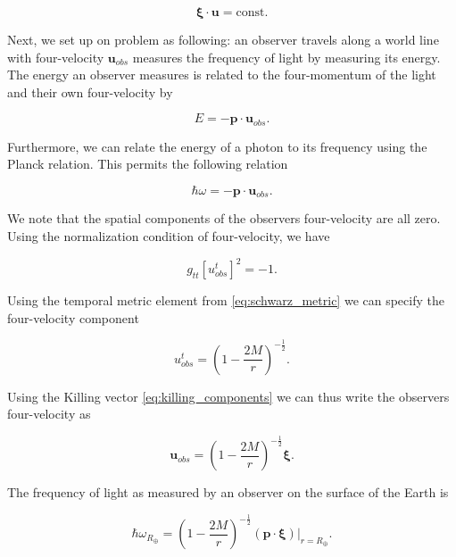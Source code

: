\documentclass[11pt]{article}
\begin{document}
\begin{equation}
    \label{eq:kiling_conserved}
    \boldsymbol{\xi} \cdot \boldsymbol{u} = \text{const}.
\end{equation}

Next, we set up on problem as following: an observer travels along a world line with four-velocity $\boldsymbol{u}_{obs}$ measures the frequency of light by measuring its energy. The energy an observer measures is related to the four-momentum of the light and their own four-velocity by

\begin{equation}
    E = - \boldsymbol{p} \cdot \boldsymbol{u}_{obs}.
\end{equation}

Furthermore, we can relate the energy of a photon to its frequency using the Planck relation. This permits the following relation

\begin{equation}
    \hbar \omega = - \boldsymbol{p} \cdot \boldsymbol{u}_{obs}.
\end{equation}

We note that the spatial components of the observers four-velocity are all zero. Using the normalization condition of four-velocity, we have

\begin{equation}
    g_{tt} [u_{obs}^t]^2 = -1.
\end{equation}

Using the temporal metric element from \eqref{eq:schwarz_metric} we can specify the four-velocity component

\begin{equation}
    u_{obs}^t = \left(1 - \frac{2M}{r}\right)^{-\frac{1}{2}}.
\end{equation}

Using the Killing vector \eqref{eq:killing_components} we can thus write the observers four-velocity as

\begin{equation}
    \boldsymbol{u}_{obs} = \left(1 - \frac{2M}{r}\right)^{-\frac{1}{2}} \boldsymbol{\xi}.
\end{equation}

The frequency of light as measured by an observer on the surface of the Earth is

\begin{equation}
    \label{eq:earth_freq}
    \hbar \omega_{R_{\oplus}} = \left(1 - \frac{2M}{r}\right)^{-\frac{1}{2}} \left(\boldsymbol{p} \cdot \boldsymbol{\xi}\right)|_{r=R_{\oplus}}.
\end{equation}
\end{document}
